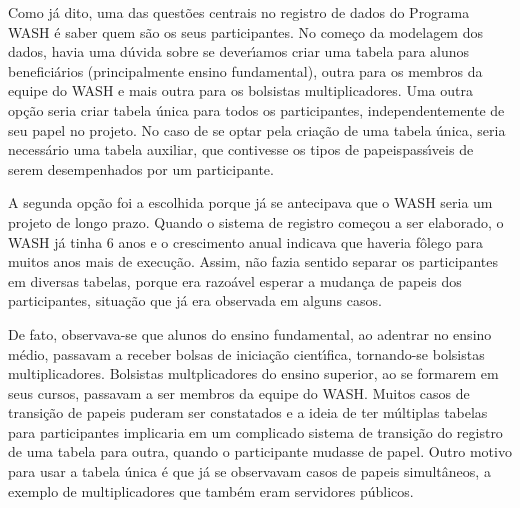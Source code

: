 \documentclass[
12pt,		%
openright,	%
twoside,  %
a4paper,			%
chapter=TITLE,		%
english,			%
french,				%
spanish,			%
brazil				%
]{USPSC-classe/USPSC}
\begin{document}
Como j\'a dito, uma das quest\~oes centrais no registro de dados do Programa WASH \'e saber quem s\~ao os seus participantes. No come\c{c}o da modelagem dos dados, havia uma d\'uvida sobre se dever\'{\i}amos criar uma tabela para alunos benefici\'arios (principalmente ensino fundamental), outra para os membros da equipe do WASH e mais outra para os bolsistas multiplicadores. Uma outra op\c{c}\~ao seria criar tabela \'unica para todos os participantes, independentemente de seu papel no projeto. No caso de se optar pela cria\c{c}\~ao de uma tabela \'unica, seria necess\'ario uma tabela auxiliar, que contivesse os \textquotedbl tipos de papeis\textquotedbl  pass\'{\i}veis de serem desempenhados por um participante.









A segunda op\c{c}\~ao foi a escolhida porque j\'a se antecipava que o WASH seria um projeto de longo prazo. Quando o sistema de registro come\c{c}ou a ser elaborado, o WASH j\'a tinha 6 anos e o crescimento anual indicava que haveria f\^olego para muitos anos mais de execu\c{c}\~ao. Assim, n\~ao fazia sentido separar os participantes em diversas tabelas, porque era razo\'avel esperar a mudan\c{c}a de papeis dos participantes, situa\c{c}\~ao que j\'a era observada em alguns casos.









De fato, observava-se que alunos do ensino fundamental, ao adentrar no ensino m\'edio, passavam a receber bolsas de inicia\c{c}\~ao cient\'{\i}fica, tornando-se bolsistas multiplicadores. Bolsistas multplicadores do ensino superior, ao se formarem em seus cursos, passavam a ser membros da equipe do WASH. Muitos casos de transi\c{c}\~ao de papeis puderam ser constatados e a ideia de ter m\'ultiplas tabelas para participantes implicaria em um complicado sistema de transi\c{c}\~ao do registro de uma tabela para outra, quando o participante mudasse de papel. Outro motivo para usar a tabela \'unica \'e que j\'a se observavam casos de papeis simult\^aneos, a exemplo de multiplicadores que tamb\'em eram servidores p\'ublicos.
\end{document}
